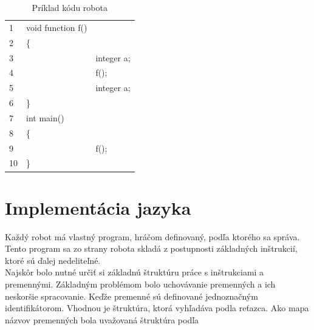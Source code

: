 \begin{table}
\centering
\begin{tabular}{| lll |}
\hline
1&void function f()&\\
2&\{&\\
3&&integer a;\\
4&&f();\\
5&&integer a;\\
6&\}&\\
7&int main()&\\
8&\{&\\
9&&	f();\\
10&\}&\\
\hline
\end{tabular}
\caption{ Príklad kódu robota }
\label{tab:rek}
\end{table}


\section{Implementácia jazyka}
Každý robot má vlastný program, hráčom definovaný, podľa ktorého sa správa. Tento program sa zo strany robota skladá z postupnosti základných inštrukcií, ktoré sú ďalej nedeliteľné. \\ 
Najskôr bolo nutné určiť si základnú štruktúru práce s inštrukciami a premennými. Základným problémom bolo uchovávanie premenných a ich neskoršie spracovanie. Keďže premenné sú definované jednoznačným identifikátorom. Vhodnou je štruktúra, ktorá vyhľadáva podla reťazca. Ako mapa názvov premenných bola uvažovaná štruktúra podľa \cite{trees}
